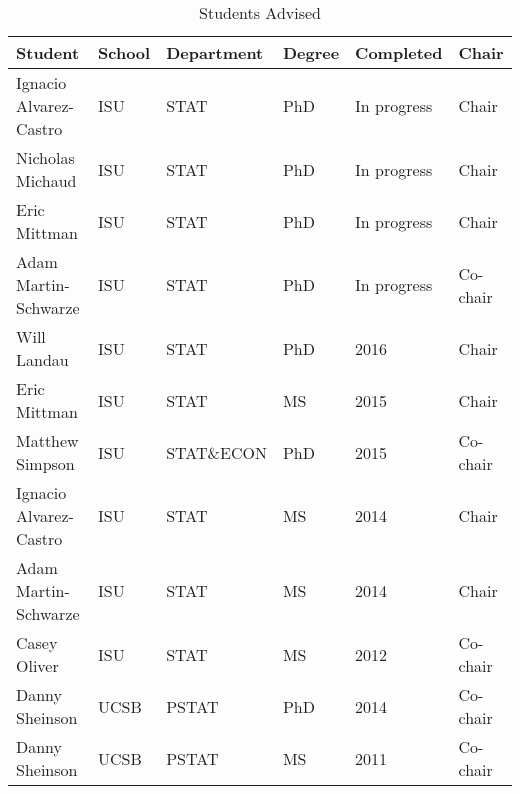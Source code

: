 \begin{table}[h]
\centering
\caption{Students Advised} 
\label{tab:advisees}
\begin{tabular}{llllll}
  \hline
Student & School & Department & Degree & Completed & Chair \\ 
  \hline
Ignacio Alvarez-Castro & ISU & STAT & PhD & In progress & Chair \\ 
  Nicholas Michaud & ISU & STAT & PhD & In progress & Chair \\ 
  Eric Mittman & ISU & STAT & PhD & In progress & Chair \\ 
  Adam Martin-Schwarze & ISU & STAT & PhD & In progress & Co-chair \\ 
  Will Landau & ISU & STAT & PhD & 2016 & Chair \\ 
  Eric Mittman & ISU & STAT & MS & 2015 & Chair \\ 
  Matthew Simpson & ISU & STAT\&ECON & PhD & 2015 & Co-chair \\ 
  Ignacio Alvarez-Castro & ISU & STAT & MS & 2014 & Chair \\ 
  Adam Martin-Schwarze & ISU & STAT & MS & 2014 & Chair \\ 
  Casey Oliver & ISU & STAT & MS & 2012 & Co-chair \\ 
  Danny Sheinson & UCSB & PSTAT & PhD & 2014 & Co-chair \\ 
  Danny Sheinson & UCSB & PSTAT & MS & 2011 & Co-chair \\ 
   \hline
\end{tabular}
\end{table}
